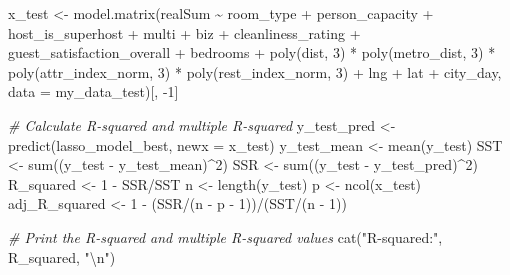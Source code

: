 \documentclass[
]{article}
\newenvironment{Shaded}{\begin{snugshade}}{\end{snugshade}}
\newcommand{\AttributeTok}[1]{\textcolor[rgb]{0.77,0.63,0.00}{#1}}
\newcommand{\CommentTok}[1]{\textcolor[rgb]{0.56,0.35,0.01}{\textit{#1}}}
\newcommand{\DecValTok}[1]{\textcolor[rgb]{0.00,0.00,0.81}{#1}}
\newcommand{\FunctionTok}[1]{\textcolor[rgb]{0.00,0.00,0.00}{#1}}
\newcommand{\NormalTok}[1]{#1}
\newcommand{\OtherTok}[1]{\textcolor[rgb]{0.56,0.35,0.01}{#1}}
\newcommand{\SpecialCharTok}[1]{\textcolor[rgb]{0.00,0.00,0.00}{#1}}
\newcommand{\StringTok}[1]{\textcolor[rgb]{0.31,0.60,0.02}{#1}}
\begin{document}
\begin{Shaded}
\begin{Highlighting}[]
\NormalTok{x\_test }\OtherTok{\textless{}{-}} \FunctionTok{model.matrix}\NormalTok{(realSum }\SpecialCharTok{\textasciitilde{}}\NormalTok{ room\_type }\SpecialCharTok{+}\NormalTok{ person\_capacity }\SpecialCharTok{+}
\NormalTok{    host\_is\_superhost }\SpecialCharTok{+}\NormalTok{ multi }\SpecialCharTok{+}\NormalTok{ biz }\SpecialCharTok{+}\NormalTok{ cleanliness\_rating }\SpecialCharTok{+}\NormalTok{ guest\_satisfaction\_overall }\SpecialCharTok{+}
\NormalTok{    bedrooms }\SpecialCharTok{+} \FunctionTok{poly}\NormalTok{(dist, }\DecValTok{3}\NormalTok{) }\SpecialCharTok{*} \FunctionTok{poly}\NormalTok{(metro\_dist, }\DecValTok{3}\NormalTok{) }\SpecialCharTok{*} \FunctionTok{poly}\NormalTok{(attr\_index\_norm,}
    \DecValTok{3}\NormalTok{) }\SpecialCharTok{*} \FunctionTok{poly}\NormalTok{(rest\_index\_norm, }\DecValTok{3}\NormalTok{) }\SpecialCharTok{+}\NormalTok{ lng }\SpecialCharTok{+}\NormalTok{ lat }\SpecialCharTok{+}\NormalTok{ city\_day, }\AttributeTok{data =}\NormalTok{ my\_data\_test)[,}
    \SpecialCharTok{{-}}\DecValTok{1}\NormalTok{]}

\CommentTok{\# Calculate R{-}squared and multiple R{-}squared}
\NormalTok{y\_test\_pred }\OtherTok{\textless{}{-}} \FunctionTok{predict}\NormalTok{(lasso\_model\_best, }\AttributeTok{newx =}\NormalTok{ x\_test)}
\NormalTok{y\_test\_mean }\OtherTok{\textless{}{-}} \FunctionTok{mean}\NormalTok{(y\_test)}
\NormalTok{SST }\OtherTok{\textless{}{-}} \FunctionTok{sum}\NormalTok{((y\_test }\SpecialCharTok{{-}}\NormalTok{ y\_test\_mean)}\SpecialCharTok{\^{}}\DecValTok{2}\NormalTok{)}
\NormalTok{SSR }\OtherTok{\textless{}{-}} \FunctionTok{sum}\NormalTok{((y\_test }\SpecialCharTok{{-}}\NormalTok{ y\_test\_pred)}\SpecialCharTok{\^{}}\DecValTok{2}\NormalTok{)}
\NormalTok{R\_squared }\OtherTok{\textless{}{-}} \DecValTok{1} \SpecialCharTok{{-}}\NormalTok{ SSR}\SpecialCharTok{/}\NormalTok{SST}
\NormalTok{n }\OtherTok{\textless{}{-}} \FunctionTok{length}\NormalTok{(y\_test)}
\NormalTok{p }\OtherTok{\textless{}{-}} \FunctionTok{ncol}\NormalTok{(x\_test)}
\NormalTok{adj\_R\_squared }\OtherTok{\textless{}{-}} \DecValTok{1} \SpecialCharTok{{-}}\NormalTok{ (SSR}\SpecialCharTok{/}\NormalTok{(n }\SpecialCharTok{{-}}\NormalTok{ p }\SpecialCharTok{{-}} \DecValTok{1}\NormalTok{))}\SpecialCharTok{/}\NormalTok{(SST}\SpecialCharTok{/}\NormalTok{(n }\SpecialCharTok{{-}} \DecValTok{1}\NormalTok{))}


\CommentTok{\# Print the R{-}squared and multiple R{-}squared values}
\FunctionTok{cat}\NormalTok{(}\StringTok{"R{-}squared:"}\NormalTok{, R\_squared, }\StringTok{"}\SpecialCharTok{\textbackslash{}n}\StringTok{"}\NormalTok{)}
\end{Highlighting}
\end{Shaded}
\end{document}
